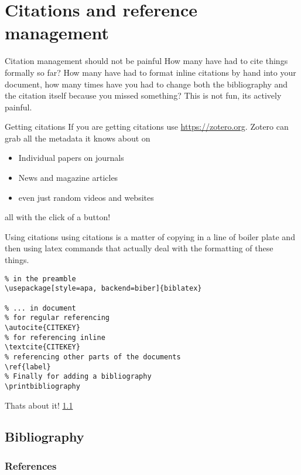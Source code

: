 \documentclass[notes]{beamer}
\begin{document}
\section{Citations and reference management}%
\begin{frame}{Citation management should not be painful}
How many have had to cite things formally so far? How many have had to format
inline citations by hand into your document, how many times have you had to
change both the bibliography and the citation itself because you missed
something? This is not fun, its actively painful.
\end{frame}
\begin{frame}{Getting citations}
If you are getting citations use \url{https://zotero.org}.
\autocite{ZoteroYourPersonal} Zotero can grab all the metadata it knows about
on

\begin{itemize}
\item Individual papers on journals
		\autocite{barkaFrameworkRolebasedDelegation2000}
  \item News and magazine articles \autocite{104yearoldChicagoWoman2023}
		\item even just random videos and websites \autocite{ZOMBO}
\end{itemize}

all with the click of a button!
\end{frame}

\begin{frame}[fragile]{Using citations}
using citations is a matter of copying in a line of boiler plate and then using
latex commands that actually deal with the formatting of these things.
\begin{verbatim}
% in the preamble
\usepackage[style=apa, backend=biber]{biblatex}

% ... in document
% for regular referencing
\autocite{CITEKEY}
% for referencing inline
\textcite{CITEKEY}
% referencing other parts of the documents
\ref{label}
% Finally for adding a bibliography
\printbibliography
\end{verbatim}
Thats about it! \ref{subsec:bib}
\end{frame}

\subsection{Bibliography}
\label{subsec:bib}
\begin{frame}[allowframebreaks]
\frametitle{References}
\printbibliography[heading=none]
\end{frame}
\end{document}
